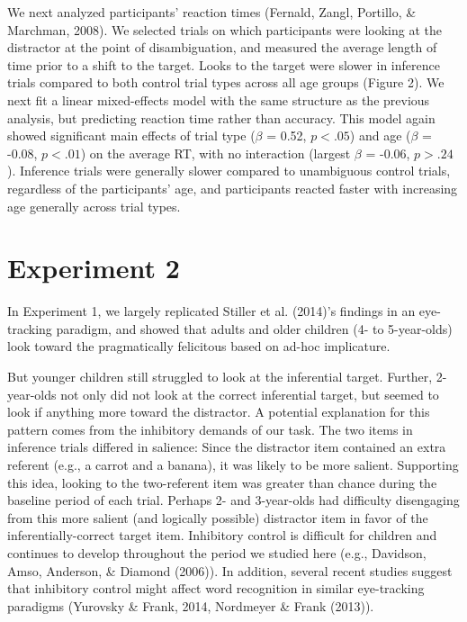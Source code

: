 \documentclass[a4paper,man,apacite,floatsintext]{apa6}
\begin{document}
We next analyzed participants' reaction times (Fernald, Zangl, Portillo,
\& Marchman, 2008). We selected trials on which participants were
looking at the distractor at the point of disambiguation, and measured
the average length of time prior to a shift to the target. Looks to the
target were slower in inference trials compared to both control trial
types across all age groups (Figure 2). We next fit a linear
mixed-effects model with the same structure as the previous analysis,
but predicting reaction time rather than accuracy. This model again
showed significant main effects of trial type (\(\beta\) = 0.52,
\(p <.05\)) and age (\(\beta\) = -0.08, \(p <.01\)) on the average RT,
with no interaction (largest \(\beta\) = -0.06, \(p >.24\)). Inference
trials were generally slower compared to unambiguous control trials,
regardless of the participants' age, and participants reacted faster
with increasing age generally across trial types.

\section{Experiment 2}\label{experiment-2}

In Experiment 1, we largely replicated Stiller et al. (2014)'s findings
in an eye-tracking paradigm, and showed that adults and older children
(4- to 5-year-olds) look toward the pragmatically felicitous based on
ad-hoc implicature.

But younger children still struggled to look at the inferential target.
Further, 2-year-olds not only did not look at the correct inferential
target, but seemed to look if anything more toward the distractor. A
potential explanation for this pattern comes from the inhibitory demands
of our task. The two items in inference trials differed in salience:
Since the distractor item contained an extra referent (e.g., a carrot
and a banana), it was likely to be more salient. Supporting this idea,
looking to the two-referent item was greater than chance during the
baseline period of each trial. Perhaps 2- and 3-year-olds had difficulty
disengaging from this more salient (and logically possible) distractor
item in favor of the inferentially-correct target item. Inhibitory
control is difficult for children and continues to develop throughout
the period we studied here (e.g., Davidson, Amso, Anderson, \& Diamond
(2006)). In addition, several recent studies suggest that inhibitory
control might affect word recognition in similar eye-tracking paradigms
(Yurovsky \& Frank, 2014, Nordmeyer \& Frank (2013)).
\end{document}
